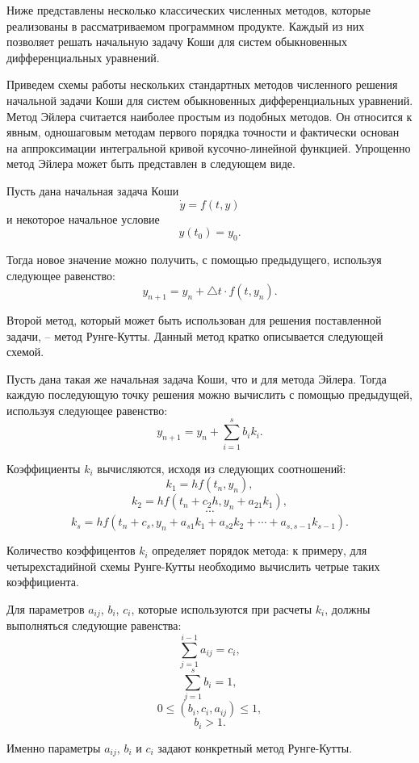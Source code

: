 \documentclass[a4paper, 14pt]{extarticle}
\theoremstyle{definition}
\begin{document}
Ниже представлены несколько классических численных методов, которые реализованы в рассматриваемом программном продукте. Каждый из них позволяет решать начальную задачу Коши для систем обыкновенных дифференциальных уравнений.

Приведем схемы работы нескольких стандартных методов численного решения начальной задачи Коши для систем обыкновенных дифференциальных уравнений. Метод Эйлера считается наиболее простым из подобных методов. Он относится к явным, одношаговым методам первого порядка точности и фактически основан на аппроксимации интегральной кривой кусочно-линейной функцией. Упрощенно метод Эйлера может быть представлен в следующем виде.

\par Пусть дана начальная задача Коши
$$\dot y = f(t, y)$$
и некоторое начальное условие
$$y(t_0) = y_0.$$

\par Тогда новое значение можно получить, с помощью предыдущего, используя следующее равенство:
$$y_{n+1} = y_n + \bigtriangleup t \cdot f(t, y_n).$$

\par Второй метод, который может быть использован для решения поставленной задачи, -- метод Рунге-Кутты. Данный метод кратко описывается следующей схемой.

\par Пусть дана такая же начальная задача Коши, что и для метода Эйлера. Тогда каждую последующую точку решения можно вычислить с помощью предыдущей, используя следующее равенство:
$$y_{n+1} = y_n + \sum_{i=1}^s b_i k_i.$$

\par Коэффициенты $k_i$ вычисляются, исходя из следующих соотношений:
$$k_1 = hf(t_n, y_n),$$
$$k_2 = hf(t_n + c_2 h, y_n + a_{21}k_1),$$
$$\cdots$$
$$k_s = hf(t_n + c_s, y_n + a_{s1}k_1 + a_{s2}k_2 + \cdots + a_{s,s-1}k_{s-1}).$$

\par Количество коэффицентов $k_i$ определяет порядок метода: к примеру, для четырехстадийной схемы Рунге-Кутты необходимо вычислить четрые таких коэффициента.

\par Для параметров $a_{ij}$, $b_i$, $c_i$, которые используются при расчеты $k_i$, должны выполняться следующие равенства:
$$\sum_{j=1}^{i-1}{a_{ij}} = c_i,$$
$$\sum_{j=1}^s{b_i} = 1,$$
$$0 \le (b_i, c_i, a_{ij}) \le 1,$$
$$b_i > 1.$$

\par Именно параметры $a_{ij}$, $b_i$ и $c_i$ задают конкретный метод Рунге-Кутты.
\end{document}

